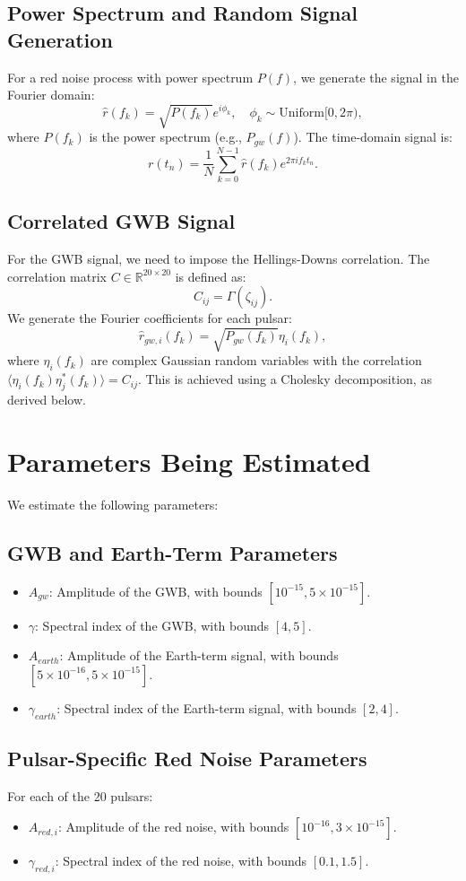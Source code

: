 \documentclass[11pt]{article}
\begin{document}
\subsection{Power Spectrum and Random Signal Generation}
For a red noise process with power spectrum $P(f)$, we generate the signal in the Fourier domain:
\[
\hat{r}(f_k) = \sqrt{P(f_k)} e^{i \phi_k}, \quad \phi_k \sim \text{Uniform}[0, 2\pi),
\]
where $P(f_k)$ is the power spectrum (e.g., $P_{gw}(f)$). The time-domain signal is:
\[
r(t_n) = \frac{1}{N} \sum_{k=0}^{N-1} \hat{r}(f_k) e^{2\pi i f_k t_n}.
\]

\subsection{Correlated GWB Signal}
For the GWB signal, we need to impose the Hellings-Downs correlation. The correlation matrix $C \in \mathbb{R}^{20 \times 20}$ is defined as:
\[
C_{ij} = \Gamma(\zeta_{ij}).
\]
We generate the Fourier coefficients for each pulsar:
\[
\hat{r}_{gw,i}(f_k) = \sqrt{P_{gw}(f_k)} \eta_i(f_k),
\]
where $\eta_i(f_k)$ are complex Gaussian random variables with the correlation $\langle \eta_i(f_k) \eta_j^*(f_k) \rangle = C_{ij}$. This is achieved using a Cholesky decomposition, as derived below.

\section{Parameters Being Estimated}
We estimate the following parameters:

\subsection{GWB and Earth-Term Parameters}
\begin{itemize}
    \item $A_{gw}$: Amplitude of the GWB, with bounds $[10^{-15}, 5 \times 10^{-15}]$.
    \item $\gamma$: Spectral index of the GWB, with bounds $[4, 5]$.
    \item $A_{earth}$: Amplitude of the Earth-term signal, with bounds $[5 \times 10^{-16}, 5 \times 10^{-15}]$.
    \item $\gamma_{earth}$: Spectral index of the Earth-term signal, with bounds $[2, 4]$.
\end{itemize}

\subsection{Pulsar-Specific Red Noise Parameters}
For each of the 20 pulsars:
\begin{itemize}
    \item $A_{red,i}$: Amplitude of the red noise, with bounds $[10^{-16}, 3 \times 10^{-15}]$.
    \item $\gamma_{red,i}$: Spectral index of the red noise, with bounds $[0.1, 1.5]$.
\end{itemize}
\end{document}
